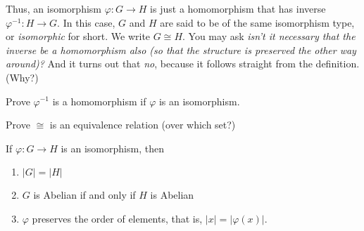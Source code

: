 \documentclass[11pt,a4paper]{article}
\begin{document}
Thus, an isomorphism \(\varphi\colon G\to H\) is just a homomorphism that has   inverse \(\varphi^{-1}\colon H\to G\).
In this case, \(G\) and \(H\) are said to be of the same isomorphism type, or \textit{isomorphic} for short. We write \(G\cong H\).
You may ask \textit{isn't  it necessary that  the inverse   be a homomorphism also (so that the structure is preserved the other way around)?}
And it turns out that \textit{no}, because it follows straight from the definition. (Why?)

\begin{eje}
    Prove \(\varphi^{-1}\) is a homomorphism if \(\varphi\) is an isomorphism.
\end{eje}

\begin{eje}
    Prove \(\cong\) is an equivalence relation (over which set?)
\end{eje}

\begin{lem}\label{lem:facts.pf.group.isomorphism}
    If \(\varphi\colon G\to H\) is an isomorphism, then 
    \begin{enumerate}[label=(\roman*)]
        \item \(|G| = |H|\)
        \item \(G\) is Abelian if and only if \(H\) is Abelian
        \item \(\varphi\) preserves the order of elements, that is, \(|x| = |\varphi(x)|\).
    \end{enumerate}
\end{lem}
\end{document}
